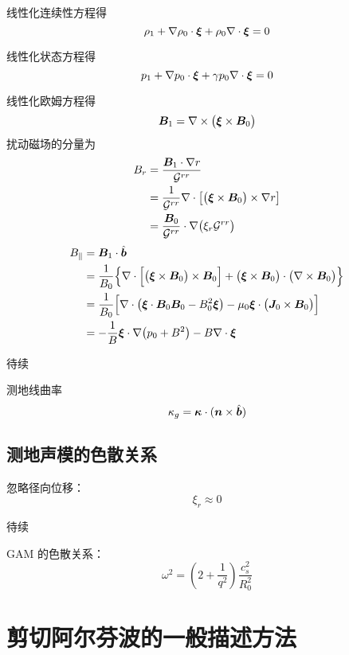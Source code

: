 线性化连续性方程得
\begin{equation}
\rho_1 + \nabla {\rho_0} \cdot \bm{\xi} + \rho_0 \nabla \cdot {\bm{\xi}} = 0
\end{equation}

线性化状态方程得
\begin{equation}
p_1 + \nabla {p_0} \cdot \bm{\xi} + \gamma p_0 \nabla \cdot {\bm{\xi}} = 0
\end{equation}

线性化欧姆方程得
\begin{equation}
\bm{B}_1 = \nabla \times {\big( \bm{\xi} \times \bm{B}_0 \big)}
\end{equation}
扰动磁场的分量为
\begin{equation}\begin{aligned}
B_r &= \frac{\bm{B}_1 \cdot \nabla {r}}{{\mathcal{G}}^{rr}} \\
&= \frac{1}{{\mathcal{G}}^{rr}} \nabla \cdot {\left[ \big(\bm{\xi} \times \bm{B}_0 \big) \times \nabla {r} \right]} \\
&= \frac{\bm{B}_0}{{\mathcal{G}}^{rr}} \cdot \nabla {\big( \xi_r {\mathcal{G}}^{rr} \big)}
\end{aligned}\end{equation}
\begin{equation}\begin{aligned}
B_\parallel &= \bm{B}_1 \cdot \hat{\bm{b}} \\
&= \frac{1}{B_0} \Big\{
\nabla \cdot {\Big[ \big(\bm{\xi} \times \bm{B}_0 \big) \times \bm{B}_0 \Big]}
+ \big(\bm{\xi} \times \bm{B}_0 \big) \cdot \big(\nabla \times {\bm{B}_0} \big)
\Big\} \\
&= \frac{1}{B_0} \Big[
\nabla \cdot {\big( \bm{\xi} \cdot \bm{B}_0 \bm{B}_0 - B_0^2 \bm{\xi} \big)}
- \mu_0 \bm{\xi} \cdot \big( \bm{J}_0 \times \bm{B}_0 \big)
\Big] \\
&= - \frac{1}{B} \bm{\xi} \cdot \nabla {\big(p_0 + B^2 \big)} - B \nabla \cdot {\bm{\xi}}
\end{aligned}\end{equation}

待续

测地线曲率
\begin{equation}
    \kappa_g = \bm{\kappa} \cdot (\bm{n} \times \hat{\bm{b}} )
\end{equation}

\subsection{测地声模的色散关系}

忽略径向位移：
\begin{equation}
\xi_r \approx 0
\end{equation}

待续

GAM 的色散关系：
\begin{equation}
\omega^2 = \left( 2 + \frac{1}{q^2} \right) \frac{c_s^2}{R_0^2}
\end{equation}

\section{剪切阿尔芬波的一般描述方法}
